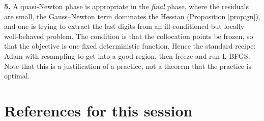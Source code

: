 \documentclass[11pt,a4paper]{article}
\begin{document}
\textbf{5.} A quasi-Newton phase is appropriate in the \emph{final} phase, where the residuals are
small, the Gauss--Newton term dominates the Hessian (Proposition \ref{prop:gn}), and one is trying
to extract the last digits from an ill-conditioned but locally well-behaved problem. The condition
is that the collocation points be frozen, so that the objective is one fixed deterministic function.
Hence the standard recipe: Adam with resampling to get into a good region, then freeze and run
L-BFGS. Note that this is a justification of a practice, not a theorem that the practice is optimal.

\newpage
\fi

\section*{References for this session}
\end{document}
